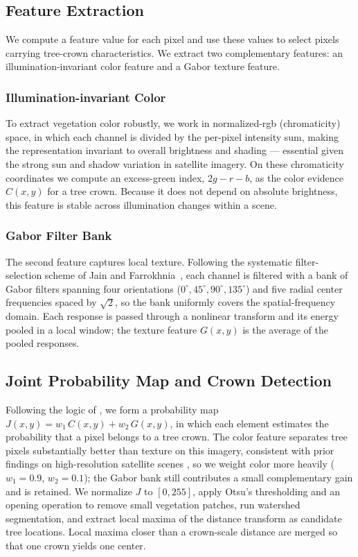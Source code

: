 \documentclass{article}
\begin{document}
\subsection{Feature Extraction}

We compute a feature value for each pixel and use these values to select pixels carrying tree-crown characteristics. We extract two complementary features: an illumination-invariant color feature and a Gabor texture feature.

\subsubsection{Illumination-invariant Color}

To extract vegetation color robustly, we work in normalized-rgb (chromaticity) space, in which each channel is divided by the per-pixel intensity sum, making the representation invariant to overall brightness and shading --- essential given the strong sun and shadow variation in satellite imagery. On these chromaticity coordinates we compute an excess-green index, $2g - r - b$, as the color evidence $C(x,y)$ for a tree crown. Because it does not depend on absolute brightness, this feature is stable across illumination changes within a scene.

\subsubsection{Gabor Filter Bank}

The second feature captures local texture. Following the systematic filter-selection scheme of Jain and Farrokhnia~\cite{JAIN19911167}, each channel is filtered with a bank of Gabor filters spanning four orientations ($0^\circ, 45^\circ, 90^\circ, 135^\circ$) and five radial center frequencies spaced by $\sqrt{2}$, so the bank uniformly covers the spatial-frequency domain. Each response is passed through a nonlinear transform and its energy pooled in a local window; the texture feature $G(x,y)$ is the average of the pooled responses.

\subsection{Joint Probability Map and Crown Detection}

Following the logic of \cite{ozcan_abdullah}, we form a probability map $J(x,y) = w_1 \, C(x,y) + w_2 \, G(x,y)$, in which each element estimates the probability that a pixel belongs to a tree crown. The color feature separates tree pixels substantially better than texture on this imagery, consistent with prior findings on high-resolution satellite scenes \cite{ozcan_abdullah}, so we weight color more heavily ($w_1=0.9$, $w_2=0.1$); the Gabor bank still contributes a small complementary gain and is retained. We normalize $J$ to $[0,255]$, apply Otsu's thresholding and an opening operation to remove small vegetation patches, run watershed segmentation, and extract local maxima of the distance transform as candidate tree locations. Local maxima closer than a crown-scale distance are merged so that one crown yields one center.
\end{document}
